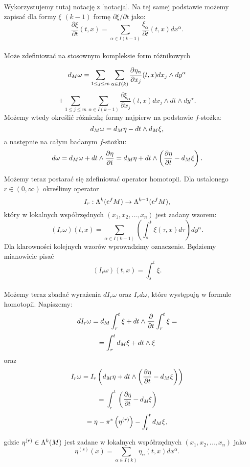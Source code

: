 \documentclass[licencjacka]{pracamgr}
\theoremstyle{definition}
\theoremstyle{definition}
\theoremstyle{plain}
\theoremstyle{plain}
\def\cfm{\ensuremath\mathrm{c}^fM}
\def\M{\ensuremath M}
\begin{document}
Wykorzystujemy tutaj notację z \ref{notacja}. Na tej samej podstawie możemy 
zapisać dla formy $\xi$ $(k-1)$ formę $\partial \xi / \partial t$ jako:
\[
    \frac{\partial \xi}{\partial t} (t, x) =
    \sum_{\alpha \in I(k-1)} \frac{\xi_\alpha}{\partial t}(t, x) dx^\alpha. 
\] \\

Może zdefiniować na stosownym
kompleksie form różnikowych

\[
    d_\M \omega =  
    \sum_{1 \leq j \leq m} \sum_{\alpha \in I(k)}
    \frac{\partial \eta_\alpha}{\partial x_j}(t, x) dx_j \wedge dy^\alpha
\]
\[
    + \sum_{1 \leq j \leq m} \sum_{\alpha \in I(k-1)}
    \frac{\partial \xi_\alpha}{\partial x_j}(t, x) dx_j \wedge dt \wedge dy^\alpha.
\]
Możemy wtedy określić różniczkę formy najpierw na podstawie $f$-stożka:
\[
    d_\M \omega = d_\M \eta - dt \wedge d_\M \xi,
\]
a następnie na całym badanym $f$-stożku:
\[
    d \omega = 
    d_\M \omega + dt \wedge \frac{\partial \eta}{\partial t} = 
    d_\M \eta + dt \wedge \left( 
        \frac{\partial \eta}{\partial t} - d_\M \xi
    \right). \\
\]

Możemy teraz postarać się zdefiniować operator homotopii.
Dla ustalonego $r \in (0, \infty)$ określimy operator
\[
    I_r: \Lambda^k(\cfm) \rightarrow \Lambda^{k-1}(\cfm),
\]
który w lokalnych współrzędnych $(x_1, x_2, ..., x_n)$ jest zadany wzorem:
\[
    (I_r \omega)(t, x) = \sum_{\alpha \in I(k-1)}
      \left(
          \int_s^t \xi(\tau, x) d\tau 
      \right) dy^\alpha.
\] 
Dla klarowności kolejnych wzorów wprowadzimy oznaczenie. Będziemy mianowicie pisać
\[
    (I_r \omega)(t, x) = \int_s^t \xi.
\] \\

Możemy teraz zbadać wyrażenia $d I_r \omega$ oraz $I_r d \omega$, które występują
w formule homotopii. Napiszemy:
\[
    d I_r \omega = d_\M \int_r^t \xi + dt \wedge \frac{\partial}{\partial t} \int_r^t \xi =
\]
\[
    = \int_r^t d_\M \xi + dt \wedge \xi
\]
oraz
\[
    I_r \omega = I_r
    \left(
        d_\M \eta + dt \wedge \left( \frac{\partial \eta}{\partial t} - d_\M \xi \right)
    \right)
\]
\[
    = \int_r^t 
        \left(
            \frac{\partial \eta}{\partial t} - d_M \xi
        \right)
\]
\[
    = \eta - \pi^\ast \left( \eta^{(r)} \right) - \int_r^t d_\M \xi,
\]

gdzie $\eta^{(r)} \in \Lambda^k (\M)$ jest zadane w lokalnych współrzędnych
$(x_1, x_2, ..., x_n)$ jako 
\[
    \eta^{(s)}(x) = \sum_{\alpha \in I(k)} \eta_\alpha(t, x) dx^\alpha.
\] \\
\end{document}
